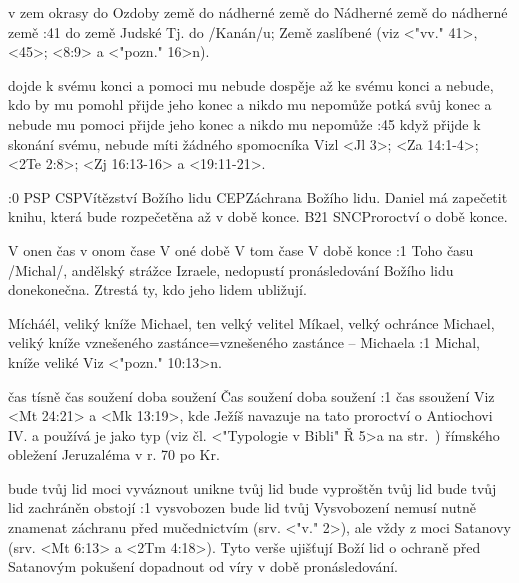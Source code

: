     {v zem okrasy}   %
    {do Ozdoby země}   %
    {do nádherné země}   %
    {do Nádherné země}   %
    {do nádherné země}   %
:41 {do země Judské}
    Tj. do \x/Kanán/u;  Země zaslíbené (viz <"vv." 41>, <45>; <8:9> a <"pozn." 16>n).


    {dojde k svému konci a pomoci mu nebude}   %
    {dospěje až ke svému konci a nebude, kdo by mu pomohl}   %
    {přijde jeho konec a nikdo mu nepomůže}   %
    {potká svůj konec a nebude mu pomoci}   %
    {přijde jeho konec a nikdo mu nepomůže}   %
:45 {když přijde k skonání svému, nebude míti žádného spomocníka}  
    Vizl <Jl 3>;  <Za 14:1-4>; <2Te 2:8>;  <Zj 16:13-16> a <19:11-21>.
    
:0 {} 
% 
        {PSP}{}%
        {CSP}{Vítězství Božího lidu}%
        {CEP}{Záchrana Božího lidu. Daniel má zapečetit knihu, která bude
              rozpečetěna až v době konce.}%
        {B21}{}%
        {SNC}{Proroctví o době konce.}%

              

    {V onen čas}   %
    {v onom čase}   %
    {V oné době}   %
    {V tom čase}   %
    {V době konce}   %
:1 {Toho času} \x/Michal/, andělský strážce Izraele, nedopustí pronásledování Božího lidu donekonečna. Ztrestá ty, kdo jeho lidem ubližují. 


    {Mícháél, veliký kníže} %
    {Michael, ten velký velitel}  %
    {Míkael, velký ochránce} %
    {Michael, veliký kníže}  %
    {vznešeného zastánce}={vznešeného zastánce -- Michaela}  %
:1 {Michal, kníže veliké} Viz <"pozn." 10:13>n.

    {čas tísně} %
    {čas soužení}  %
    {doba soužení} %
    {Čas soužení}  %
    {doba soužení}  %
:1 {čas ssoužení} 
      Viz <Mt 24:21> a <Mk 13:19>, kde Ježíš navazuje na tato proroctví o Antiochovi IV. a používá je jako typ (viz čl. <"Typologie v Bibli" Ř 5>a na str.~\pg) římského obležení Jeruzaléma v r. 70 po Kr. 
      
    {bude tvůj lid moci vyváznout} %
    {unikne tvůj lid}  %
    {bude vyproštěn tvůj lid} %
    {bude tvůj lid zachráněn}  %
    {obstojí}  %
:1 {vysvobozen bude lid tvůj} Vysvobození nemusí nutně znamenat záchranu před  mučednictvím (srv. <"v." 2>), ale vždy z moci Satanovy (srv. <Mt 6:13> a <2Tm 4:18>). Tyto verše ujišťují Boží lid o ochraně před Satanovým pokušení dopadnout od víry v době pronásledování. 

